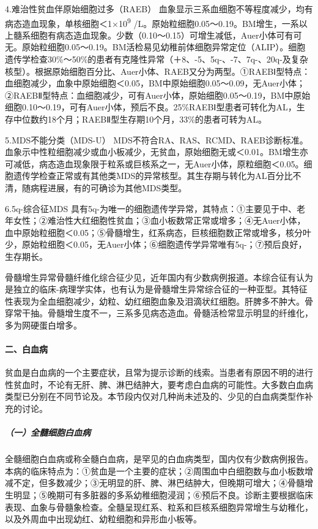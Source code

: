 4.难治性贫血伴原始细胞过多（RAEB）
血象显示三系血细胞不等程度减少，均有病态造血现象，单核细胞＜1×10\textsuperscript{9}
/L。原始粒细胞0.05～0.19。BM增生，一系以上髓系细胞有病态造血现象。少数（0.10～0.15）可增生减低，Auer小体可有可无。原始粒细胞0.05～0.19。BM活检易见幼稚前体细胞异常定位（ALIP）。细胞遗传学检查30\%～50\%的患者有克隆性异常（＋8、-5、5q-、-7、7q-、20q-及复杂核型）。根据原始细胞百分比、Auer小体、RAEB又分为两型。①RAEBⅠ型特点：血细胞减少，血象中原始细胞＜0.05，BM中原始细胞0.05～0.09，无Auer小体；②RAEBⅡ型特点：血细胞减少，可有Auer小体，原始细胞0.05～0.19，BM中原始细胞0.10～0.19，可有Auer小体，预后不良。25\%RAEBⅠ型患者可转化为AL，生存中位数约18个月；RAEBⅡ型生存期10个月，33\%的患者可转为AL。

5.MDS不能分类（MDS-U）
MDS不符合RA、RAS、RCMD、RAEB诊断标准。血象示中性粒细胞减少或血小板减少，无贫血，原始细胞无或＜0.01。BM增生亦可减低，病态造血现象限于粒系或巨核系之一，无Auer小体，原粒细胞＜0.05。细胞遗传学检查正常或有其他类MDS的异常核型。其生存期与转化为AL百分比不清，随病程进展，有的可确诊为其他MDS类型。

6.5q-综合征MDS
具有5q-为唯一的细胞遗传学异常，其特点：①主要见于中、老年女性；②难治性大红细胞性贫血；③血小板数常正常或增多；④无Auer小体，血中原始粒细胞＜0.05；⑤骨髓增生，红系病态，巨核细胞数正常或增多，核分叶少，原始粒细胞＜0.05，无Auer小体；⑥细胞遗传学异常唯有5q-；⑦预后良好，生存期长。

骨髓增生异常骨髓纤维化综合征少见，近年国内有少数病例报道。本综合征有认为是独立的临床-病理学实体，也有认为是骨髓增生异常综合征的一种亚型。其特征性表现为全血细胞减少，幼粒、幼红细胞血象及泪滴状红细胞。肝脾多不肿大。骨穿常干抽。骨髓增生度不一，三系多见病态造血。骨髓活检常显示明显的纤维化，多为网硬蛋白增多。

\paragraph{二、白血病}

贫血是白血病的一个主要症状，且常为提示诊断的线索。当患者有原因不明的进行性贫血时，不论有无肝、脾、淋巴结肿大，要考虑白血病的可能性。大多数白血病类型已分别在不同节论及。本节段内仅对几种尚未述及的、少见的白血病类型作补充的讨论。

\subparagraph{（一）全髓细胞白血病}

全髓细胞白血病或称全髓白血病，是罕见的白血病类型，国内仅有少数病例报告。本病的临床特点为：①贫血是一个主要的症状；②周围血中白细胞数与血小板数增减不定，但多数减少；③无明显的肝、脾、淋巴结肿大，但晚期可增大；④骨髓增生明显；⑤晚期可有多脏器的多系幼稚细胞浸润；⑥预后不良。诊断主要根据临床表现、血象与骨髓象检查。全髓呈现红系、粒系和巨核系细胞异常增生与幼稚化，以及外周血中出现幼红、幼粒细胞和异形血小板等。

